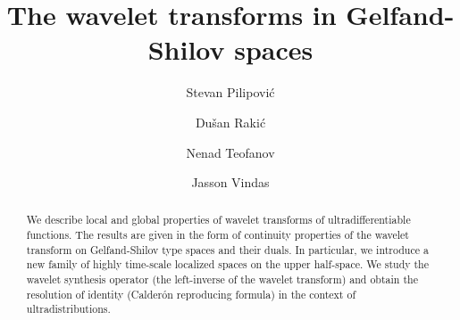 \documentclass[reqno,12pt]{amsart}
\theoremstyle{plain}
\theoremstyle{definition}
\theoremstyle{remark}
\begin{document}
\title
{The wavelet transforms in Gelfand-Shilov spaces}

\author[S. Pilipovi\'{c}]{Stevan Pilipovi\'{c}}
\address{S. Pilipovi\'{c}\\ University of Novi Sad, Faculty of Sciences\\ Department
 of Mathematics and Informatics\\ Trg Dositeja Obradovi\' ca 4\\ 21000 Novi Sad \\ Serbia }

\author[D. Raki\'{c}]{Du\v{s}an Raki\'{c}}
\address{D. Raki\'{c}\\ University of Novi Sad\\ Faculty of Technology\\ Bul. cara Lazara 1\\ 21000 Novi Sad \\ Serbia}

\author[N. Teofanov]{Nenad Teofanov}
\address{N. Teofanov\\ University of Novi Sad, Faculty of Sciences\\ Department
 of Mathematics and Informatics\\ Trg Dositeja Obradovi\' ca 4\\ 21000 Novi Sad \\ Serbia }

\author[J. Vindas]{Jasson Vindas}
\address{J. Vindas\\ Department of Mathematics\\ Ghent University\\ Krijgslaan 281 Gebouw S22\\ B 9000 Gent\\ Belgium}


\begin{abstract}
We describe local and global properties of wavelet transforms of
ultradifferentiable functions. The results are given in the form of continuity properties of the wavelet transform on Gelfand-Shilov type spaces
and their duals. In particular, we introduce
a new family of highly time-scale localized spaces on the upper half-space. We study
the wavelet synthesis operator (the left-inverse of the wavelet transform) and obtain the
resolution of identity (Calder\'{o}n reproducing formula) in the context of ultradistributions.
\end{abstract}
\end{document}
